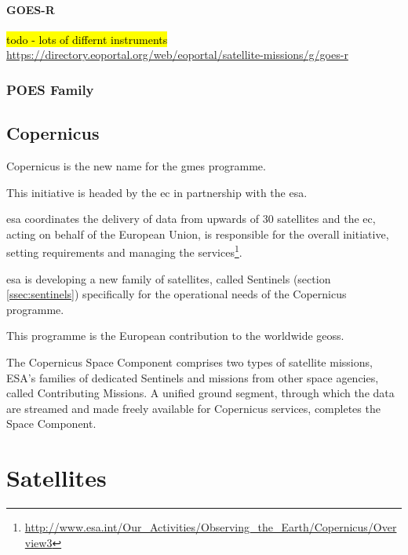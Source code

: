 \documentclass{article}
\begin{document}
\paragraph{GOES-R}
\label{sssec:goesr}

\hl{todo - lots of differnt instruments} 
\url{https://directory.eoportal.org/web/eoportal/satellite-missions/g/goes-r}


\subsubsection{POES Family}
\label{sssec:poes}



\subsection{Copernicus}
\label{ssec:copernicus}

Copernicus is the new name for the \ac{gmes} programme. 

This initiative is headed by the \ac{ec} in partnership with the \ac{esa}.

\ac{esa} coordinates the delivery of data from upwards of 30 satellites and the \ac{ec}, acting on behalf of the European Union, is responsible for the overall initiative, setting requirements and managing the services\footnote{\url{http://www.esa.int/Our_Activities/Observing_the_Earth/Copernicus/Overview3}}.

\ac{esa} is developing a new family of satellites, called Sentinels (section \ref{ssec:sentinels}) specifically for the operational needs of the Copernicus programme.

This programme is the European contribution to the worldwide \ac{geoss}.

The Copernicus Space Component comprises two types of satellite missions, ESA's families of dedicated Sentinels and missions from other space agencies, called Contributing Missions. A unified ground segment, through which the data are streamed and made freely available for Copernicus services, completes the Space Component.


\section{Satellites}
\label{sec:satellites}
\end{document}
